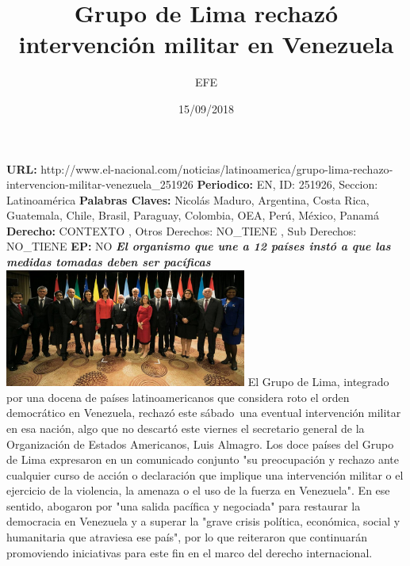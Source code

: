 \documentclass{article}%
\title{\textbf{Grupo de Lima rechazó intervención militar en Venezuela}}%
\author{EFE}%
\date{15/09/2018}%
\begin{document}
%
\normalsize%
\maketitle%
\textbf{URL: }%
http://www.el{-}nacional.com/noticias/latinoamerica/grupo{-}lima{-}rechazo{-}intervencion{-}militar{-}venezuela\_251926\newline%
%
\textbf{Periodico: }%
EN, %
ID: %
251926, %
Seccion: %
Latinoamérica\newline%
%
\textbf{Palabras Claves: }%
Nicolás Maduro, Argentina, Costa Rica, Guatemala, Chile, Brasil, Paraguay, Colombia, OEA, Perú, México, Panamá\newline%
%
\textbf{Derecho: }%
CONTEXTO%
, Otros Derechos: %
NO\_TIENE%
, Sub Derechos: %
NO\_TIENE%
\newline%
%
\textbf{EP: }%
NO\newline%
\newline%
%
\textbf{\textit{El organismo que une a 12 países instó a que las medidas tomadas deben ser pacíficas}}%
\newline%
\newline%
%
\includegraphics[width=300px]{11.jpg}%
\newline%
%
El Grupo de Lima, integrado por una docena de países latinoamericanos que considera roto el orden democrático en Venezuela, rechazó este sábado~una eventual intervención militar en esa nación, algo que no descartó este viernes el secretario general de la Organización de Estados Americanos, Luis Almagro.%
\newline%
%
Los doce países del Grupo de Lima expresaron en un comunicado conjunto "su preocupación y rechazo ante cualquier curso de acción o declaración que implique una intervención militar o el ejercicio de la violencia, la amenaza o el uso de la fuerza en Venezuela".%
\newline%
%
En ese sentido, abogaron por "una salida pacífica y negociada" para restaurar la democracia en Venezuela y a superar la "grave crisis política, económica, social y humanitaria que atraviesa ese país", por lo que reiteraron que continuarán promoviendo iniciativas para este fin en el marco del derecho internacional.%
\end{document}

